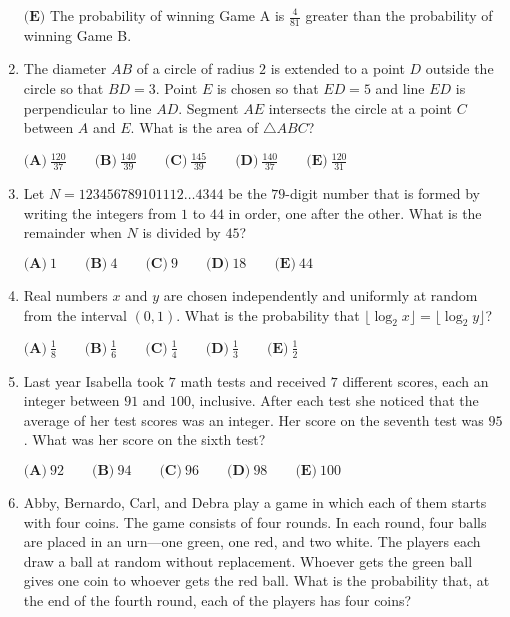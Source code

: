 \documentclass{article}
\begin{document}
\begin{enumerate}[label=\arabic*., itemsep=0.5em]
$\textbf{(E)}$ The probability of winning Game A is $\frac{4}{81}$ greater than the probability of winning Game B.\par \vspace{0.5em}\item The diameter $AB$ of a circle of radius $2$ is extended to a point $D$ outside the circle so that $BD=3$. Point $E$ is chosen so that $ED=5$ and line $ED$ is perpendicular to line $AD$. Segment $AE$ intersects the circle at a point $C$ between $A$ and $E$. What is the area of $\triangle 
ABC$?

$\textbf{(A)}\ \frac{120}{37}\qquad\textbf{(B)}\ \frac{140}{39}\qquad\textbf{(C)}\ \frac{145}{39}\qquad\textbf{(D)}\ \frac{140}{37}\qquad\textbf{(E)}\ \frac{120}{31}$\par \vspace{0.5em}\item Let $N=123456789101112\dots4344$ be the $79$-digit number that is formed by writing the integers from $1$ to $44$ in order, one after the other. What is the remainder when $N$ is divided by $45$?

$\textbf{(A)}\ 1\qquad\textbf{(B)}\ 4\qquad\textbf{(C)}\ 9\qquad\textbf{(D)}\ 18\qquad\textbf{(E)}\ 44$\par \vspace{0.5em}\item Real numbers $x$ and $y$ are chosen independently and uniformly at random from the interval $(0,1)$. What is the probability that $\lfloor\log_2x\rfloor=\lfloor\log_2y\rfloor$?

$\textbf{(A)}\ \frac{1}{8}\qquad\textbf{(B)}\ \frac{1}{6}\qquad\textbf{(C)}\ \frac{1}{4}\qquad\textbf{(D)}\ \frac{1}{3}\qquad\textbf{(E)}\ \frac{1}{2}$\par \vspace{0.5em}\item Last year Isabella took $7$ math tests and received $7$ different scores, each an integer between $91$ and $100$, inclusive. After each test she noticed that the average of her test scores was an integer. Her score on the seventh test was $95$. What was her score on the sixth test?

$\textbf{(A)}\ 92\qquad\textbf{(B)}\ 94\qquad\textbf{(C)}\ 96\qquad\textbf{(D)}\ 98\qquad\textbf{(E)}\ 100$\par \vspace{0.5em}\item Abby, Bernardo, Carl, and Debra play a game in which each of them starts with four coins. The game consists of four rounds. In each round, four balls are placed in an urn---one green, one red, and two white. The players each draw a ball at random without replacement. Whoever gets the green ball gives one coin to whoever gets the red ball. What is the probability that, at the end of the fourth round, each of the players has four coins?


\end{enumerate}
\end{document}
